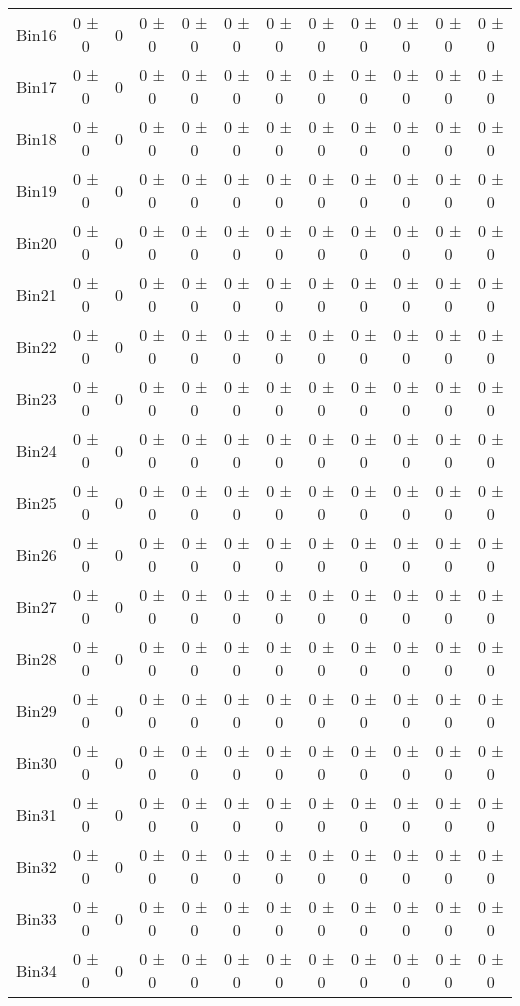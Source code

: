 \begin{tabular}{@{\extracolsep{4pt}}lccccccccccc@{}}
     Bin16 & 0 ± 0 & 0 & 0 ± 0 & 0 ± 0 & 0 ± 0 & 0 ± 0 & 0 ± 0 & 0 ± 0 & 0 ± 0 & 0 ± 0 & 0 ± 0 \\ 
     Bin17 & 0 ± 0 & 0 & 0 ± 0 & 0 ± 0 & 0 ± 0 & 0 ± 0 & 0 ± 0 & 0 ± 0 & 0 ± 0 & 0 ± 0 & 0 ± 0 \\ 
     Bin18 & 0 ± 0 & 0 & 0 ± 0 & 0 ± 0 & 0 ± 0 & 0 ± 0 & 0 ± 0 & 0 ± 0 & 0 ± 0 & 0 ± 0 & 0 ± 0 \\ 
     Bin19 & 0 ± 0 & 0 & 0 ± 0 & 0 ± 0 & 0 ± 0 & 0 ± 0 & 0 ± 0 & 0 ± 0 & 0 ± 0 & 0 ± 0 & 0 ± 0 \\ 
     Bin20 & 0 ± 0 & 0 & 0 ± 0 & 0 ± 0 & 0 ± 0 & 0 ± 0 & 0 ± 0 & 0 ± 0 & 0 ± 0 & 0 ± 0 & 0 ± 0 \\ 
     Bin21 & 0 ± 0 & 0 & 0 ± 0 & 0 ± 0 & 0 ± 0 & 0 ± 0 & 0 ± 0 & 0 ± 0 & 0 ± 0 & 0 ± 0 & 0 ± 0 \\ 
     Bin22 & 0 ± 0 & 0 & 0 ± 0 & 0 ± 0 & 0 ± 0 & 0 ± 0 & 0 ± 0 & 0 ± 0 & 0 ± 0 & 0 ± 0 & 0 ± 0 \\ 
     Bin23 & 0 ± 0 & 0 & 0 ± 0 & 0 ± 0 & 0 ± 0 & 0 ± 0 & 0 ± 0 & 0 ± 0 & 0 ± 0 & 0 ± 0 & 0 ± 0 \\ 
     Bin24 & 0 ± 0 & 0 & 0 ± 0 & 0 ± 0 & 0 ± 0 & 0 ± 0 & 0 ± 0 & 0 ± 0 & 0 ± 0 & 0 ± 0 & 0 ± 0 \\ 
     Bin25 & 0 ± 0 & 0 & 0 ± 0 & 0 ± 0 & 0 ± 0 & 0 ± 0 & 0 ± 0 & 0 ± 0 & 0 ± 0 & 0 ± 0 & 0 ± 0 \\ 
     Bin26 & 0 ± 0 & 0 & 0 ± 0 & 0 ± 0 & 0 ± 0 & 0 ± 0 & 0 ± 0 & 0 ± 0 & 0 ± 0 & 0 ± 0 & 0 ± 0 \\ 
     Bin27 & 0 ± 0 & 0 & 0 ± 0 & 0 ± 0 & 0 ± 0 & 0 ± 0 & 0 ± 0 & 0 ± 0 & 0 ± 0 & 0 ± 0 & 0 ± 0 \\ 
     Bin28 & 0 ± 0 & 0 & 0 ± 0 & 0 ± 0 & 0 ± 0 & 0 ± 0 & 0 ± 0 & 0 ± 0 & 0 ± 0 & 0 ± 0 & 0 ± 0 \\ 
     Bin29 & 0 ± 0 & 0 & 0 ± 0 & 0 ± 0 & 0 ± 0 & 0 ± 0 & 0 ± 0 & 0 ± 0 & 0 ± 0 & 0 ± 0 & 0 ± 0 \\ 
     Bin30 & 0 ± 0 & 0 & 0 ± 0 & 0 ± 0 & 0 ± 0 & 0 ± 0 & 0 ± 0 & 0 ± 0 & 0 ± 0 & 0 ± 0 & 0 ± 0 \\ 
     Bin31 & 0 ± 0 & 0 & 0 ± 0 & 0 ± 0 & 0 ± 0 & 0 ± 0 & 0 ± 0 & 0 ± 0 & 0 ± 0 & 0 ± 0 & 0 ± 0 \\ 
     Bin32 & 0 ± 0 & 0 & 0 ± 0 & 0 ± 0 & 0 ± 0 & 0 ± 0 & 0 ± 0 & 0 ± 0 & 0 ± 0 & 0 ± 0 & 0 ± 0 \\ 
     Bin33 & 0 ± 0 & 0 & 0 ± 0 & 0 ± 0 & 0 ± 0 & 0 ± 0 & 0 ± 0 & 0 ± 0 & 0 ± 0 & 0 ± 0 & 0 ± 0 \\ 
     Bin34 & 0 ± 0 & 0 & 0 ± 0 & 0 ± 0 & 0 ± 0 & 0 ± 0 & 0 ± 0 & 0 ± 0 & 0 ± 0 & 0 ± 0 & 0 ± 0 \\ 

\end{tabular}
